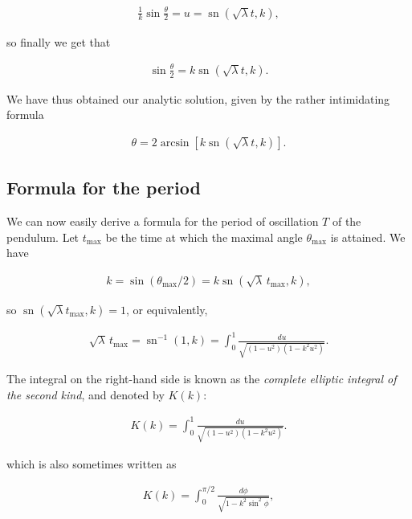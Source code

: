\documentclass[11pt]{report}
\theoremstyle{plain}
\theoremstyle{definition}
\begin{document}
\begin{align*}
\frac{1}{k}\sin\frac{\theta}{2} = u = \operatorname{sn}(\sqrt{\lambda}t ,k),
\end{align*}

\noindent so finally we get that

\begin{equation*} \tag{24}\label{eq:pendulum-almostfinal}
\begin{split}
\sin\frac{\theta}{2} = k \operatorname{sn}(\sqrt{\lambda}t ,k).
\end{split}
\end{equation*}

\noindent We have thus obtained our analytic solution, given by
the rather intimidating formula

\begin{align*}
\theta  = 2 \arcsin \left[k \operatorname{sn}(\sqrt{\lambda}t ,k)\right].
\end{align*}

\subsection{Formula for the period}

We can now easily derive a formula for the period of
oscillation $T$ of the pendulum. Let
$t_{\textrm{max}}$ be the time at which the maximal
angle $\theta_{\textrm{max}}$ is attained. We have

\begin{align*}
k = \sin(\theta_{\textrm{max}}/2) = k \operatorname{sn}(\sqrt{\lambda}\, t_{\textrm{max}},k),
\end{align*}

\noindent so
$\operatorname{sn}(\sqrt{\lambda}
t_{\textrm{max}},k)=1$,
or equivalently,

\begin{align*}
\sqrt{\lambda}\, t_{\textrm{max}} = \operatorname{sn}^{-1}(1,k) = \int_0^1 \frac{du}{\sqrt{(1-u^2)(1-k^2u^2)}}.
\end{align*}

\noindent The integral on the right-hand side is known as the
\emph{complete elliptic integral of the second kind}, and
denoted by $K(k)$:

\begin{align*}
K(k) = \int_0^1 \frac{du}{\sqrt{(1-u^2)(1-k^2u^2)}}.
\end{align*}

\noindent which is also sometimes written as

\begin{align*}
K(k) = \int_0^{\pi/2} \frac{d\phi}{\sqrt{1-k^2 \sin^2\phi}},
\end{align*}
\end{document}
